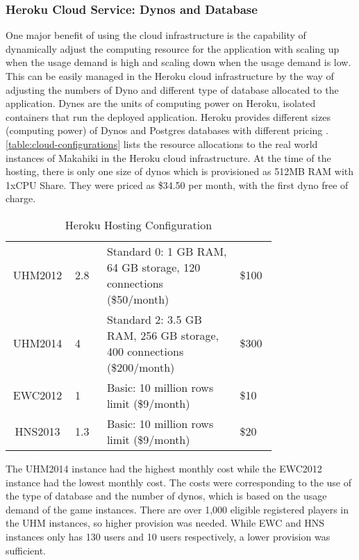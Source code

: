 \subsubsection{Heroku Cloud Service: Dynos and Database}

One major benefit of using the cloud infrastructure is the capability of dynamically adjust the computing resource for the application with scaling up when the usage demand is high and scaling down when the usage demand is low. This can be easily managed in the Heroku cloud infrastructure by the way of adjusting the numbers of Dyno and different type of database allocated to the application. Dynes are the units of computing power on Heroku, isolated containers that run the deployed application. Heroku provides different sizes (computing power) of Dynos and Postgres databases with different pricing \cite{heroku-pricing}. \autoref{table:cloud-configurations} lists the resource allocations to the real world instances of Makahiki in the Heroku cloud infrastructure. At the time of the hosting, there is only one size of dynos which is provisioned as 512MB RAM with 1xCPU Share. They were priced as \$34.50 per month, with the first dyno free of charge.

\begin{table}[ht!]
  \centering
  \begin{tabular} {|c|P{0.12\linewidth}|P{0.5\linewidth}|P{0.14\linewidth}|}
    \hline
     &
     &
     &
     \\
    \hline
    UHM2012 & 2.8 & Standard 0:  1 GB RAM, 64 GB storage, 120 connections (\$50/month) & \$100 \\
    \hline
    UHM2014 & 4 & Standard 2: 3.5 GB RAM, 256 GB storage, 400 connections (\$200/month) & \$300 \\
    \hline
    EWC2012 & 1 & Basic: 10 million rows limit (\$9/month) & \$10 \\
    \hline
    HNS2013 & 1.3 & Basic: 10 million rows limit (\$9/month) & \$20 \\
    \hline
  \end{tabular}
  \caption{Heroku Hosting Configuration}
  \label{table:cloud-configurations}
\end{table}

The UHM2014 instance had the highest monthly cost while the EWC2012 instance had the lowest monthly cost. The costs were corresponding to the use of the type of database and the number of dynos, which is based on the usage demand of the game instances. There are over 1,000 eligible registered players in the UHM instances, so higher provision was needed. While EWC and HNS instances only has 130 users and 10 users respectively, a lower provision was sufficient. 

